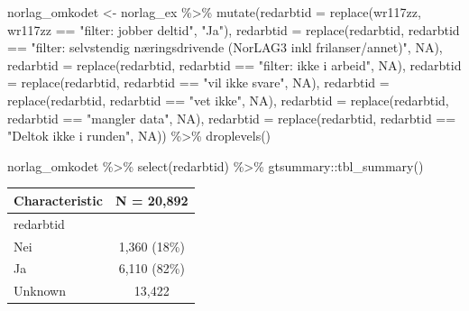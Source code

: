 \documentclass[
  letterpaper,
  DIV=11,
  numbers=noendperiod]{scrreprt}
\newenvironment{Shaded}{\begin{snugshade}}{\end{snugshade}}
\newcommand{\AttributeTok}[1]{\textcolor[rgb]{0.40,0.45,0.13}{#1}}
\newcommand{\ConstantTok}[1]{\textcolor[rgb]{0.56,0.35,0.01}{#1}}
\newcommand{\FunctionTok}[1]{\textcolor[rgb]{0.28,0.35,0.67}{#1}}
\newcommand{\NormalTok}[1]{\textcolor[rgb]{0.00,0.23,0.31}{#1}}
\newcommand{\OtherTok}[1]{\textcolor[rgb]{0.00,0.23,0.31}{#1}}
\newcommand{\SpecialCharTok}[1]{\textcolor[rgb]{0.37,0.37,0.37}{#1}}
\newcommand{\StringTok}[1]{\textcolor[rgb]{0.13,0.47,0.30}{#1}}
\theoremstyle{definition}
\theoremstyle{remark}
\begin{document}
\begin{Shaded}
\begin{Highlighting}[]
\NormalTok{norlag\_omkodet }\OtherTok{\textless{}{-}}\NormalTok{ norlag\_ex }\SpecialCharTok{\%\textgreater{}\%}
  \FunctionTok{mutate}\NormalTok{(}\AttributeTok{redarbtid =} \FunctionTok{replace}\NormalTok{(wr117zz, wr117zz }\SpecialCharTok{==} \StringTok{"filter: jobber deltid"}\NormalTok{, }\StringTok{"Ja"}\NormalTok{), }
         \AttributeTok{redarbtid =} \FunctionTok{replace}\NormalTok{(redarbtid, redarbtid }\SpecialCharTok{==} \StringTok{"filter: selvstendig næringsdrivende (NorLAG3 inkl frilanser/annet)"}\NormalTok{, }\ConstantTok{NA}\NormalTok{),}
         \AttributeTok{redarbtid =} \FunctionTok{replace}\NormalTok{(redarbtid, redarbtid }\SpecialCharTok{==} \StringTok{"filter: ikke i arbeid"}\NormalTok{, }\ConstantTok{NA}\NormalTok{),}
         \AttributeTok{redarbtid =} \FunctionTok{replace}\NormalTok{(redarbtid, redarbtid }\SpecialCharTok{==} \StringTok{"vil ikke svare"}\NormalTok{, }\ConstantTok{NA}\NormalTok{),}
         \AttributeTok{redarbtid =} \FunctionTok{replace}\NormalTok{(redarbtid, redarbtid }\SpecialCharTok{==} \StringTok{"vet ikke"}\NormalTok{, }\ConstantTok{NA}\NormalTok{),}
         \AttributeTok{redarbtid =} \FunctionTok{replace}\NormalTok{(redarbtid, redarbtid }\SpecialCharTok{==} \StringTok{"mangler data"}\NormalTok{, }\ConstantTok{NA}\NormalTok{),}
         \AttributeTok{redarbtid =} \FunctionTok{replace}\NormalTok{(redarbtid, redarbtid }\SpecialCharTok{==} \StringTok{"Deltok ikke i runden"}\NormalTok{, }\ConstantTok{NA}\NormalTok{)) }\SpecialCharTok{\%\textgreater{}\%} 
  \FunctionTok{droplevels}\NormalTok{()}

\NormalTok{norlag\_omkodet }\SpecialCharTok{\%\textgreater{}\%} 
  \FunctionTok{select}\NormalTok{(redarbtid) }\SpecialCharTok{\%\textgreater{}\%} 
\NormalTok{  gtsummary}\SpecialCharTok{::}\FunctionTok{tbl\_summary}\NormalTok{()}
\end{Highlighting}
\end{Shaded}

\begin{longtable}[]{@{}lc@{}}
\toprule()
\textbf{Characteristic} & \textbf{N = 20,892} \\
\midrule()
\endhead
redarbtid & \\
Nei & 1,360 (18\%) \\
Ja & 6,110 (82\%) \\
Unknown & 13,422 \\
\bottomrule()
\end{longtable}
\end{document}

